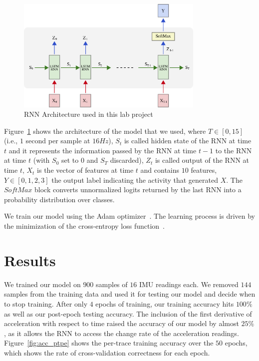 \documentclass{article}
\begin{document}
\begin{figure}[t]
    \centering
    \vspace{-8pt}
    \includegraphics[width=0.8\textwidth]{figures/rnn_full}
    \caption{RNN Architecture used in this lab project \label{fig:rnn_architecture}}
    \vspace{-6pt}
\end{figure}

Figure~\ref{fig:rnn_architecture} shows the architecture of the model that we used, where
$T \in [0,15]$ (i.e., $1$ second per sample at $16Hz$), $S_t$ is called hidden state of the
RNN at time $t$ and it represents the information passed by the RNN at time $t-1$ to the RNN
at time $t$ (with $S_0$ set to $0$ and $S_T$ discarded), $Z_t$ is called output of the RNN
at time $t$, $X_t$ is the vector of features at time $t$ and contains $10$ features,
$Y \in [0,1,2,3]$ the output label indicating the activity that generated $X$.
The $SoftMax$ block converts
unnormalized logits returned by the last RNN into a probability distribution over classes.

We train our model using the Adam optimizer~\cite{kingma2014adam}.
The learning process is driven by the minimization of the cross-entropy loss
function~\cite{rubinstein1999cross}.


\section{Results}
\vspace{-.3cm}
We trained our model on $900$ samples of $16$ IMU readings each. We removed $144$ samples
from the training data and used it for testing our model and decide when to stop training.
After only $4$ epochs of training, our training accuracy hits $100\%$ as well as our
post-epoch testing accuracy.
The inclusion of the first derivative of acceleration with respect to time raised the accuracy
of our model by almost $25\%$, as it allows the RNN to access the change rate of the
acceleration readings. Figure~\ref{fig:acc_ptpe} shows the per-trace training
accuracy over the $50$ epochs, which shows the rate of cross-validation correctness
for each epoch.
\end{document}
